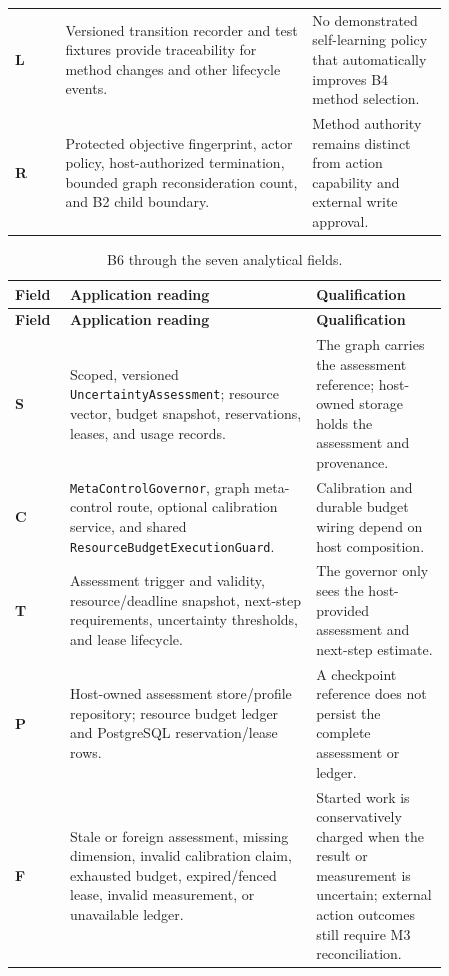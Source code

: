 \begin{longtable}{@{}>{\raggedright\arraybackslash}p{0.10\linewidth} >{\raggedright\arraybackslash}p{0.49\linewidth} >{\raggedright\arraybackslash}p{0.27\linewidth}@{}}
\textbf{L} & Versioned transition recorder and test fixtures provide traceability for method changes and other lifecycle events. & No demonstrated self-learning policy that automatically improves B4 method selection. \\
\textbf{R} & Protected objective fingerprint, actor policy, host-authorized termination, bounded graph reconsideration count, and B2 child boundary. & Method authority remains distinct from action capability and external write approval. \\
\bottomrule
\end{longtable}

\begin{longtable}{@{}>{\raggedright\arraybackslash}p{0.10\linewidth} >{\raggedright\arraybackslash}p{0.49\linewidth} >{\raggedright\arraybackslash}p{0.27\linewidth}@{}}
\caption{B6 through the seven analytical fields.}\label{tab:ch23-b6-seven-fields}\\
\toprule
\textbf{Field} & \textbf{Application reading} & \textbf{Qualification} \\
\midrule
\endfirsthead
\toprule
\textbf{Field} & \textbf{Application reading} & \textbf{Qualification} \\
\midrule
\endhead
\textbf{S} & Scoped, versioned \texttt{UncertaintyAssessment}; resource vector, budget snapshot, reservations, leases, and usage records. & The graph carries the assessment reference; host-owned storage holds the assessment and provenance. \\
\textbf{C} & \texttt{MetaControlGovernor}, graph meta-control route, optional calibration service, and shared \texttt{ResourceBudgetExecution\allowbreak Guard}. & Calibration and durable budget wiring depend on host composition. \\
\textbf{T} & Assessment trigger and validity, resource/deadline snapshot, next-step requirements, uncertainty thresholds, and lease lifecycle. & The governor only sees the host-provided assessment and next-step estimate. \\
\textbf{P} & Host-owned assessment store/profile repository; resource budget ledger and PostgreSQL reservation/lease rows. & A checkpoint reference does not persist the complete assessment or ledger. \\
\textbf{F} & Stale or foreign assessment, missing dimension, invalid calibration claim, exhausted budget, expired/fenced lease, invalid measurement, or unavailable ledger. & Started work is conservatively charged when the result or measurement is uncertain; external action outcomes still require M3 reconciliation. \\

\end{longtable}
